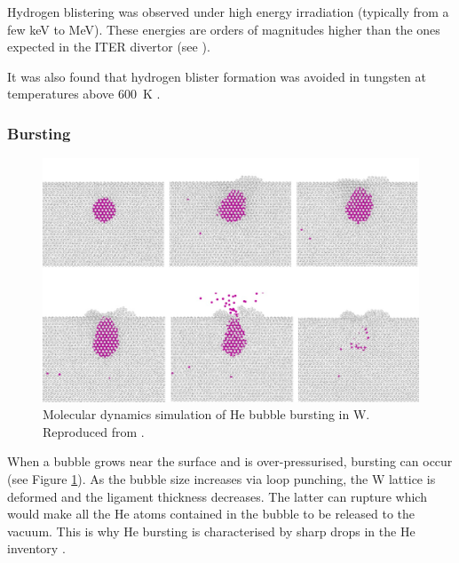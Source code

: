 Hydrogen blistering was observed under high energy irradiation (typically from a few \si{keV} to \si{MeV}).
These energies are orders of magnitudes higher than the ones expected in the ITER divertor (see ).

It was also found that hydrogen blister formation was avoided in tungsten at temperatures above \SI{600}{K} .

\subsubsection{Bursting}

\begin{figure} [h!]
    \centering
    \includegraphics[width=\linewidth]{Figures/Chapter1/bubble_bursting_zhou.jpg}
    \caption{Molecular dynamics simulation of He bubble bursting in W. Reproduced from \cite{zhou_growth_2019}.}
    \label{fig: bubble bursting zhou}
\end{figure}

When a bubble grows near the surface and is over-pressurised, bursting can occur (see Figure \ref{fig: bubble bursting zhou}).
As the bubble size increases via loop punching, the W lattice is deformed and the ligament thickness decreases.
The latter can rupture which would make all the He atoms contained in the bubble to be released to the vacuum.
This is why He bursting is characterised by sharp drops in the He inventory .

